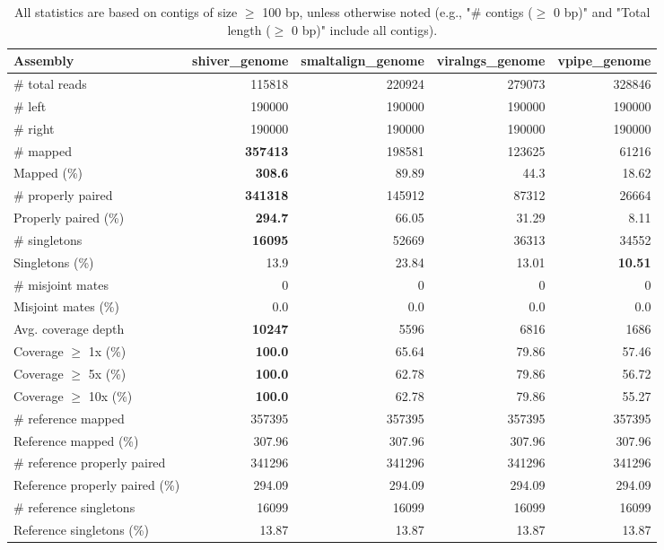 \documentclass[12pt,a4paper]{article}
\begin{document}
\begin{table}[ht]
\begin{center}
\caption{All statistics are based on contigs of size $\geq$ 100 bp, unless otherwise noted (e.g., "\# contigs ($\geq$ 0 bp)" and "Total length ($\geq$ 0 bp)" include all contigs).}
\begin{tabular}{|l*{4}{|r}|}
\hline
Assembly & shiver\_genome & smaltalign\_genome & viralngs\_genome & vpipe\_genome \\ \hline
\# total reads & 115818 & 220924 & 279073 & 328846 \\ \hline
\# left & 190000 & 190000 & 190000 & 190000 \\ \hline
\# right & 190000 & 190000 & 190000 & 190000 \\ \hline
\# mapped & {\bf 357413} & 198581 & 123625 & 61216 \\ \hline
Mapped (\%) & {\bf 308.6} & 89.89 & 44.3 & 18.62 \\ \hline
\# properly paired & {\bf 341318} & 145912 & 87312 & 26664 \\ \hline
Properly paired (\%) & {\bf 294.7} & 66.05 & 31.29 & 8.11 \\ \hline
\# singletons & {\bf 16095} & 52669 & 36313 & 34552 \\ \hline
Singletons (\%) & 13.9 & 23.84 & 13.01 & {\bf 10.51} \\ \hline
\# misjoint mates & 0 & 0 & 0 & 0 \\ \hline
Misjoint mates (\%) & 0.0 & 0.0 & 0.0 & 0.0 \\ \hline
Avg. coverage depth & {\bf 10247} & 5596 & 6816 & 1686 \\ \hline
Coverage $\geq$ 1x (\%) & {\bf 100.0} & 65.64 & 79.86 & 57.46 \\ \hline
Coverage $\geq$ 5x (\%) & {\bf 100.0} & 62.78 & 79.86 & 56.72 \\ \hline
Coverage $\geq$ 10x (\%) & {\bf 100.0} & 62.78 & 79.86 & 55.27 \\ \hline
\# reference mapped & 357395 & 357395 & 357395 & 357395 \\ \hline
Reference mapped (\%) & 307.96 & 307.96 & 307.96 & 307.96 \\ \hline
\# reference properly paired & 341296 & 341296 & 341296 & 341296 \\ \hline
Reference properly paired (\%) & 294.09 & 294.09 & 294.09 & 294.09 \\ \hline
\# reference singletons & 16099 & 16099 & 16099 & 16099 \\ \hline
Reference singletons (\%) & 13.87 & 13.87 & 13.87 & 13.87 \\ \hline

\end{tabular}
\end{center}
\end{table}
\end{document}
